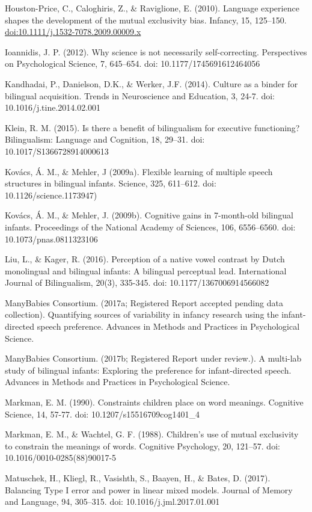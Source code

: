 \documentclass[,man,floatsintext]{apa6}
\begin{document}
Houston-Price, C., Caloghiris, Z., \& Raviglione, E. (2010). Language experience shapes the development of the mutual exclusivity bias. Infancy, 15, 125--150. \url{doi:10.1111/j.1532-7078.2009.00009.x}

Ioannidis, J. P. (2012). Why science is not necessarily self-correcting. Perspectives on Psychological Science, 7, 645--654. doi: 10.1177/1745691612464056

Kandhadai, P., Danielson, D.K., \& Werker, J.F. (2014). Culture as a binder for bilingual acquisition. Trends in Neuroscience and Education, 3, 24-7. doi: 10.1016/j.tine.2014.02.001

Klein, R. M. (2015). Is there a benefit of bilingualism for executive functioning? Bilingualism: Language and Cognition, 18, 29--31. doi: 10.1017/S1366728914000613

Kovács, Á. M., \& Mehler, J (2009a). Flexible learning of multiple speech structures in bilingual infants. Science, 325, 611--612. doi: 10.1126/science.1173947)

Kovács, Á. M., \& Mehler, J. (2009b). Cognitive gains in 7-month-old bilingual infants. Proceedings of the National Academy of Sciences, 106, 6556--6560. doi: 10.1073/pnas.0811323106

Liu, L., \& Kager, R. (2016). Perception of a native vowel contrast by Dutch monolingual and bilingual infants: A bilingual perceptual lead. International Journal of Bilingualism, 20(3), 335-345. doi: 10.1177/1367006914566082

ManyBabies Consortium. (2017a; Registered Report accepted pending data collection). Quantifying sources of variability in infancy research using the infant-directed speech preference. Advances in Methods and Practices in Psychological Science.

ManyBabies Consortium. (2017b; Registered Report under review.). A multi-lab study of bilingual infants: Exploring the preference for infant-directed speech. Advances in Methods and Practices in Psychological Science.

Markman, E. M. (1990). Constraints children place on word meanings. Cognitive Science, 14, 57-77. doi: 10.1207/s15516709cog1401\_4

Markman, E. M., \& Wachtel, G. F. (1988). Children's use of mutual exclusivity to constrain the meanings of words. Cognitive Psychology, 20, 121--57. doi: 10.1016/0010-0285(88)90017-5

Matuschek, H., Kliegl, R., Vasishth, S., Baayen, H., \& Bates, D. (2017). Balancing Type I error and power in linear mixed models. Journal of Memory and Language, 94, 305--315. doi: 10.1016/j.jml.2017.01.001
\end{document}
